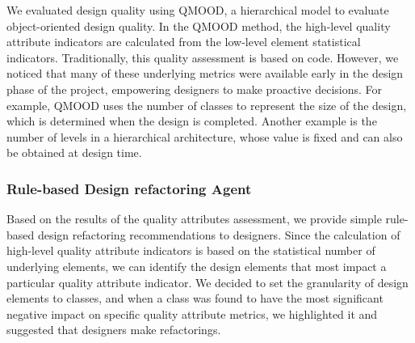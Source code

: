 \documentclass[pdflatex,sn-mathphys-num]{sn-jnl}%
\theoremstyle{thmstyleone}%
\theoremstyle{thmstyletwo}%
\theoremstyle{thmstylethree}%
\begin{document}

We evaluated design quality using QMOOD, a hierarchical model to evaluate object-oriented design quality. In the QMOOD method, the high-level quality attribute indicators are calculated from the low-level element statistical indicators. Traditionally, this quality assessment is based on code. However, we noticed that many of these underlying metrics were available early in the design phase of the project, empowering designers to make proactive decisions. For example, QMOOD uses the number of classes to represent the size of the design, which is determined when the design is completed. Another example is the number of levels in a hierarchical architecture, whose value is fixed and can also be obtained at design time.
\subsubsection{Rule-based Design refactoring Agent}
Based on the results of the quality attributes assessment, we provide simple rule-based design refactoring recommendations to designers. Since the calculation of high-level quality attribute indicators is based on the statistical number of underlying elements, we can identify the design elements that most impact a particular quality attribute indicator. We decided to set the granularity of design elements to classes, and when a class was found to have the most significant negative impact on specific quality attribute metrics, we highlighted it and suggested that designers make refactorings.
\end{document}
